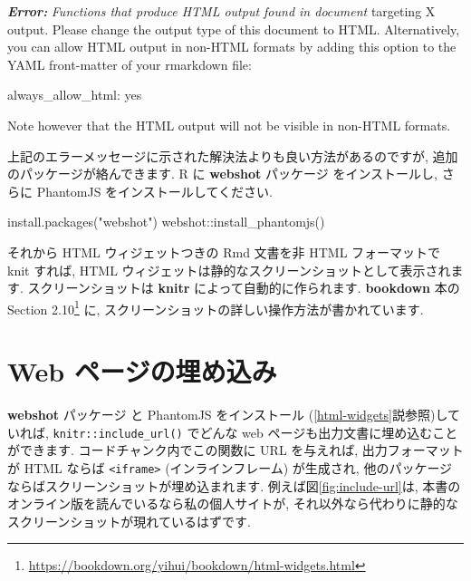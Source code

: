\documentclass[
  11pt,
  lualatex,ja=standard,jafont=noto]{bxjsreport}
\newenvironment{Shaded}{\begin{snugshade}}{\end{snugshade}}
\newcommand{\AnnotationTok}[1]{\textcolor[rgb]{0.56,0.35,0.01}{\textbf{\textit{#1}}}}
\newcommand{\CommentTok}[1]{\textcolor[rgb]{0.56,0.35,0.01}{\textit{#1}}}
\newcommand{\FunctionTok}[1]{\textcolor[rgb]{0.00,0.00,0.00}{#1}}
\newcommand{\NormalTok}[1]{#1}
\newcommand{\SpecialCharTok}[1]{\textcolor[rgb]{0.00,0.00,0.00}{#1}}
\newcommand{\StringTok}[1]{\textcolor[rgb]{0.31,0.60,0.02}{#1}}
\renewcommand{\href}[2]{#2\footnote{\url{#1}}}
\begin{document}
\begin{Shaded}
\begin{Highlighting}[]
\AnnotationTok{Error:}\CommentTok{ Functions that produce HTML output found in document}
\NormalTok{targeting X output. Please change the output type of this}
\NormalTok{document to HTML. Alternatively, you can allow HTML output in}
\NormalTok{non{-}HTML formats by adding this option to the YAML front{-}matter}
\NormalTok{of your rmarkdown file:}

\NormalTok{  always\_allow\_html: yes}

\NormalTok{Note however that the HTML output will not be visible in}
\NormalTok{non{-}HTML formats.}
\end{Highlighting}
\end{Shaded}

上記のエラーメッセージに示された解決法よりも良い方法があるのですが, 追加のパッケージが絡んできます. R に \textbf{webshot} パッケージ\autocite{R-webshot} をインストールし, さらに PhantomJS をインストールしてください.

\begin{Shaded}
\begin{Highlighting}[numbers=left,,]
\FunctionTok{install.packages}\NormalTok{(}\StringTok{"webshot"}\NormalTok{)}
\NormalTok{webshot}\SpecialCharTok{::}\FunctionTok{install\_phantomjs}\NormalTok{()}
\end{Highlighting}
\end{Shaded}

それから HTML ウィジェットつきの Rmd 文書を非 HTML フォーマットで knit すれば, HTML ウィジェットは静的なスクリーンショットとして表示されます. スクリーンショットは \textbf{knitr} によって自動的に作られます. \textbf{bookdown} 本の \href{https://bookdown.org/yihui/bookdown/html-widgets.html}{Section 2.10} に, スクリーンショットの詳しい操作方法が書かれています.

\hypertarget{include-url}{%
\section{Web ページの埋め込み}\label{include-url}}

\textbf{webshot} パッケージ \autocite{R-webshot} と PhantomJS をインストール (\ref{html-widgets}説参照)していれば, \texttt{knitr::include\_url()} でどんな web ページも出力文書に埋め込むことができます. コードチャンク内でこの関数に URL を与えれば, 出力フォーマットが HTML ならば \texttt{\textless{}iframe\textgreater{}} (インラインフレーム) が生成され, 他のパッケージならばスクリーンショットが埋め込まれます. 例えば図\ref{fig:include-url}は, 本書のオンライン版を読んでいるなら私の個人サイトが, それ以外なら代わりに静的なスクリーンショットが現れているはずです.
\end{document}
